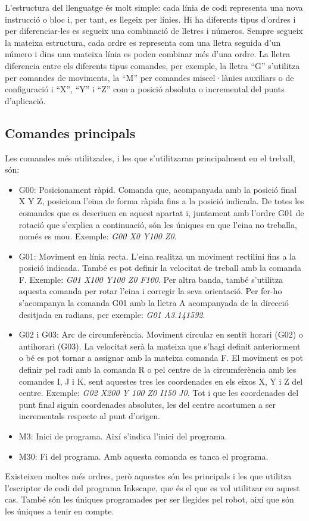 L'estructura del llenguatge és molt simple: cada línia de codi representa una nova instrucció o bloc i, per tant, es llegeix per línies. Hi ha diferents tipus d'ordres i per diferenciar-les es segueix una combinació de lletres i números. Sempre segueix la mateixa estructura, cada ordre es representa com una lletra seguida d'un número i dins una mateixa línia es poden combinar més d'una ordre. La lletra diferencia entre els diferents tipus comandes, per exemple, la lletra “G” s'utilitza per comandes de moviments, la “M” per comandes miscel·lànies auxiliars o de configuració i “X”, “Y” i “Z” com a posició absoluta o incremental del punts d'aplicació.  

\subsection{Comandes principals}
Les comandes més utilitzades, i les que s'utilitzaran principalment en el treball, són:

\begin{itemize}
	\item	G00: Posicionament ràpid. Comanda que, acompanyada amb la posició final X Y Z, posiciona l'eina de forma ràpida fins a la posició indicada. De totes les comandes que es descriuen en aquest apartat i, juntament amb l'ordre G01 de rotació que s'explica a continuació, són les úniques en que l'eina no treballa, només es mou. Exemple: \emph{G00 X0 Y100 Z0}.
	
	\item	G01: Moviment en línia recta. L'eina realitza un moviment rectilini fins a la posició indicada. També es pot definir la velocitat de treball amb la comanda F. Exemple: \emph{G01 X100 Y100 Z0 F100}. Per altra banda, també s'utilitza aquesta comanda per rotar l'eina i corregir la seva orientació. Per fer-ho s'acompanya la comanda G01 amb la lletra A acompanyada de la direcció desitjada en radians, per exemple: \emph{G01 A3.141592}.
	
	\item	G02 i G03: Arc de circumferència.  Moviment circular en sentit horari (G02) o antihorari (G03). La velocitat serà la mateixa que s'hagi definit anteriorment o bé es pot tornar a assignar amb la mateixa comanda F. El moviment es pot definir pel radi amb la comanda R o pel centre de la circumferència amb les comandes I, J i K, sent aquestes tres les coordenades en els eixos X, Y i Z del centre. Exemple: \emph{G02 X200 Y 100 Z0 I150 J0}. Tot i que les coordenades del punt final siguin coordenades absolutes, les del centre acostumen a ser incrementals respecte al punt d'origen.
	
	\item	M3: Inici de programa. Així s'indica l'inici del programa.
	
	\item	M30: Fi del programa. Amb aquesta comanda es tanca el programa. 
\end{itemize}
Existeixen moltes més ordres, però aquestes són les principals i les que utilitza l'escriptor de codi  del programa Inkscape, que és el que es vol utilitzar en aquest cas. També són les úniques programades per ser llegides pel robot, així que són les úniques a tenir en compte. 



